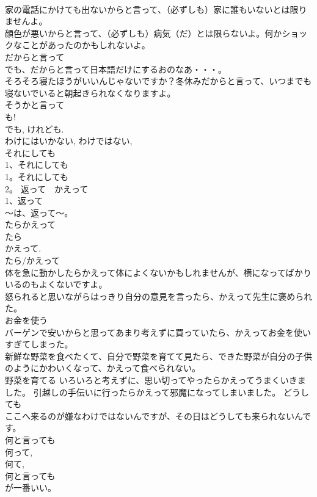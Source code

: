 \documentclass[8pt]{extreport}
\begin{document}
\begin{CJK}{UTF8}{min}
\\	家の電話にかけても出ないからと言って、（必ずしも）家に誰もいないとは限りませんよ。 
\\	顔色が悪いからと言って、（必ずしも）病気（だ）とは限らないよ。何かショックなことがあったのかもしれないよ。 
\\	だからと言って 
\\	でも、だからと言って日本語だけにするおのなあ・・・。 
\\	そろそろ寝たほうがいいんじゃないですか？冬休みだからと言って、いつまでも寝ないでいると朝起きられなくなりますよ。 
\\	そうかと言って 
\\	も! 
\\	でも, けれども. 
\\	わけにはいかない, わけではない, 
\\	それにしても 
\\	1、それにしても
\\	1。それにしても
\\	2。 返って　かえって 
\\	1、返って
\\	～は、返って～。 
\\	たらかえって 
\\	たら 
\\	かえって. 
\\	たら/かえって 
\\	体を急に動かしたらかえって体によくないかもしれませんが、横になってばかりいるのもよくないですよ。 
\\	怒られると思いながらはっきり自分の意見を言ったら、かえって先生に褒められた。 
\\	お金を使う　　
\\	バーゲンで安いからと思ってあまり考えずに買っていたら、かえってお金を使いすぎてしまった。 
\\	新鮮な野菜を食べたくて、自分で野菜を育てて見たら、できた野菜が自分の子供のようにかわいくなって、かえって食べられない。 
\\	野菜を育てる いろいろと考えずに、思い切ってやったらかえってうまくいきました。 引越しの手伝いに行ったらかえって邪魔になってしまいました。 どうしても 
\\	ここへ来るのが嫌なわけではないんですが、その日はどうしても来られないんです。 
\\	何と言っても 
\\	何って, 
\\	何て, 
\\	何と言っても
\\	が一番いい。

\end{CJK}
\end{document}
